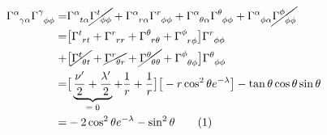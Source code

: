 \documentclass[]{article}
\newcommand\numberthis{\addtocounter{equation}{1}\tag{\theequation}}
\begin{document}
\begin{align*}
	\Gamma\indices{^\alpha_{\gamma\alpha}} \Gamma\indices{^\gamma_{\phi\phi}} =&\Gamma\indices{^\alpha_{t\alpha}} \cancel{\Gamma\indices{^t_{\phi\phi}}}+ \Gamma\indices{^\alpha_{r\alpha}} \Gamma\indices{^r_{\phi\phi}}+\Gamma\indices{^\alpha_{\theta\alpha}} \Gamma\indices{^\theta_{\phi\phi}}+\Gamma\indices{^\alpha_{\phi\alpha}} \cancel{\Gamma\indices{^\phi_{\phi\phi}}}\\
	=&\big[\Gamma\indices{^t_{rt}}+\Gamma\indices{^r_{rr}}+\Gamma\indices{^\theta_{r\theta}}+\Gamma\indices{^\phi_{r\phi}}\big] \Gamma\indices{^r_{\phi\phi}}\\
	+&\big[\cancel{\Gamma\indices{^t_{\theta t}}}+\cancel{\Gamma\indices{^r_{\theta r}}}+\cancel{\Gamma\indices{^\theta_{\theta\theta}}}+\Gamma\indices{^\phi_{\theta\phi}}\big] \Gamma\indices{^\theta_{\phi\phi}}\\
	=& \big[\underbrace{\frac{\nu^\prime}{2} + \frac{\lambda^\prime}{2}}_\text{$=0$}+\frac{1}{r}+\frac{1}{r}\big]\big[-r \cos^2\theta e^{-\lambda}\big] - \tan \theta \cos \theta \sin \theta\\
	=& - 2 \cos^2\theta e^{-\lambda} -\sin^2\theta\numberthis \label{eq:prod:1}
\end{align*}
\end{document}
